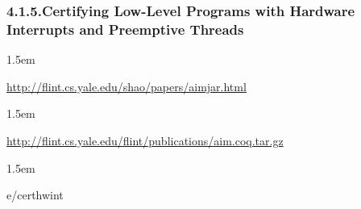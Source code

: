 \documentclass[12pt,twoside]{article}
\begin{document}
\subsubsection{4.1.5.\hspace*{0.5em}Certifying Low-Level Programs with Hardware Interrupts and Preemptive Threads}\label{sec-certifying-low-level-programs-with-hardware-interrupts-and-preemptive-threads}%

\begin{mddefinitions}%


\begin{mdbmarginx}{}{}{}{1.5em}%
\begin{mddefdata}%
\href{http://flint.cs.yale.edu/shao/papers/aimjar.html}{{\ttfamily http://\hspace{0pt}flint.\hspace{0pt}cs.\hspace{0pt}yale.\hspace{0pt}edu/\hspace{0pt}shao/\hspace{0pt}papers/\hspace{0pt}aimjar.\hspace{0pt}html}}
\end{mddefdata}%
\end{mdbmarginx}%


\begin{mdbmarginx}{}{}{}{1.5em}%
\begin{mddefdata}%
\href{http://flint.cs.yale.edu/flint/publications/aim.coq.tar.gz}{{\ttfamily http://\hspace{0pt}flint.\hspace{0pt}cs.\hspace{0pt}yale.\hspace{0pt}edu/\hspace{0pt}flint/\hspace{0pt}publications/\hspace{0pt}aim.\hspace{0pt}coq.\hspace{0pt}tar.\hspace{0pt}gz}}
\end{mddefdata}%
\end{mdbmarginx}%


\begin{mdbmarginx}{}{}{}{1.5em}%
\begin{mddefdata}%
e/certhwint%
\end{mddefdata}%
\end{mdbmarginx}%
\end{mddefinitions}%
\end{document}
